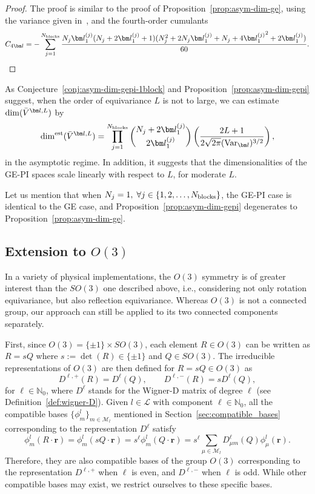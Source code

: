 \documentclass{article}
\newcommand{\bV}{{\bar V}}
\newcommand{\dimpi}[2]{\dim(\bV^{#1,#2})}
\newcommand{\dimpiest}[2]{\dim^{\textup{est}}(\bV^{#1,#2})}
\numberwithin{equation}{section}
\def\N{\mathbb{N}}
\def\Nb{{N_{\rm blocks}}}
\def\br{{\bm r}}
\def\bl{{\bm l}}
\def\calM{\mathcal{M}}
\def\calL{\mathcal{L}}
\def\dim{{{\rm dim}}}
\begin{document}
\begin{proof}
    The proof is similar to the proof of Proposition~\ref{prop:asym-dim-ge}, using the variance given in~\cite[(43)]{takacs1986asymptotic}, and the fourth-order cumulants
    \[
    C_{4\bl} = -\sum_{j=1}^\Nb \frac{N_j \bl^{(j)}_1 (N_j+2\bl^{(j)}_1+1)(N_j^2+2N_j
    \bl^{(j)}_1+N_j+4{\bl^{(j)}_1}^2+2\bl^{(j)}_1)}{60}.
    \]
\end{proof}

As Conjecture~\ref{conj:asym-dim-gepi-1block} and Proposition~\ref{prop:asym-dim-gepi} suggest, when the order of equivariance $L$ is not to large, we can estimate $\dimpi{\bl}{L}$ by 
\[ \dimpiest{\bl}{L} = \prod_{j=1}^\Nb \binom{N_j+2\bl^{(j)}_1 }{ 2\bl^{(j)}_1}\left(\frac{2L+1}{2\sqrt{2\pi}(\textup{Var}_\bl)^{3/2}}\right), \]
in the asymptotic regime. In addition, it suggests that the dimensionalities of the GE-PI spaces scale linearly with respect to $L$, for moderate $L$.

Let us mention that when $N_j=1, \;\forall j\in\{1,2,\ldots,\Nb\}$, the GE-PI case is identical to the GE case, and Proposition~\ref{prop:asym-dim-gepi} degenerates to Proposition~\ref{prop:asym-dim-ge}. 


\subsection{Extension to $O(3)$}

In a variety of physical implementations, the $O(3)$ symmetry is of greater interest than the $SO(3)$ one described above, i.e., considering not only rotation equivariance, but also reflection equivariance. Whereas $O(3)$ is not a connected group, our approach can still be applied to its two connected components separately. 

First, since $O(3)=\{\pm1\}\times SO(3)$, each element $R\in O(3)$ can be written as $R=sQ$ where $s:=\det(R)\in\{\pm1\}$ and $Q\in SO(3)$.
The irreducible representations of $O(3)$ are then defined for $R=sQ\in O(3)$ as
\[
    D^{\ell,+}(R) = D^\ell(Q),
    \qquad
    D^{\ell,-}(R) = sD^\ell(Q),
\]
for $\ell\in\N_0$, where $D^\ell$ stands for the Wigner-D matrix of degree $\ell$ (see Definition~\ref{def:wigner-D}). 
Given $l\in\calL$ with component $\ell\in\N_0$, all the compatible bases $\{\phi^l_m\}_{m\in\calM_l}$ mentioned in Section~\ref{sec:compatible_bases} corresponding to the representation $D^\ell$ satisfy
\begin{equation}\label{eq:equiv-1p-basis-O3}
    \phi^l_m(R\cdot\br) = \phi^l_m(sQ\cdot\br) = s^\ell\phi^l_m(Q\cdot\br)=s^\ell\sum_{\mu\in\calM_l}D^\ell_{\mu m}(Q)\phi^l_{\mu}(\br).
\end{equation}
Therefore, they are also compatible bases of the group $O(3)$ corresponding to the representation $D^{\ell,+}$ when $\ell$ is even, and $D^{\ell,-}$ when $\ell$ is odd. While other compatible bases may exist, we restrict ourselves to these specific bases. 
\end{document}
